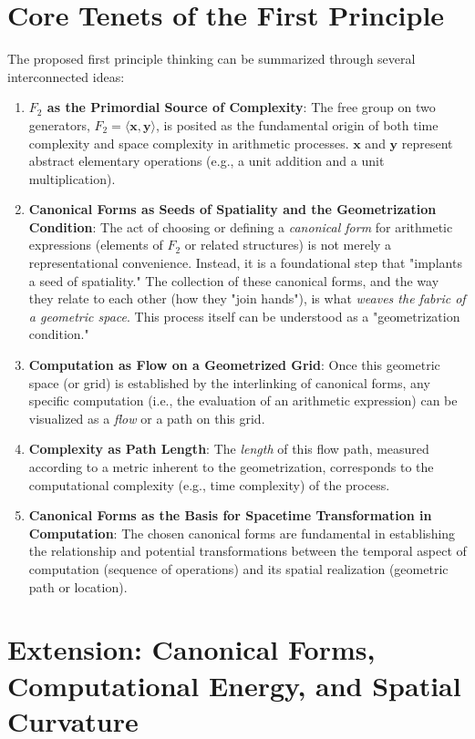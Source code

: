 \documentclass[12pt, a4paper]{article}
\theoremstyle{definition}
\begin{document}
\section{Core Tenets of the First Principle}

The proposed first principle thinking can be summarized through several interconnected ideas:

\begin{enumerate}
    \item \textbf{$F_2$ as the Primordial Source of Complexity}: The free group on two generators, $F_2 = \langle \mathbf{x}, \mathbf{y} \rangle$, is posited as the fundamental origin of both time complexity and space complexity in arithmetic processes. $\mathbf{x}$ and $\mathbf{y}$ represent abstract elementary operations (e.g., a unit addition and a unit multiplication).
    \item \textbf{Canonical Forms as Seeds of Spatiality and the Geometrization Condition}: The act of choosing or defining a \textit{canonical form} for arithmetic expressions (elements of $F_2$ or related structures) is not merely a representational convenience. Instead, it is a foundational step that "implants a seed of spatiality." The collection of these canonical forms, and the way they relate to each other (how they "join hands"), is what \textit{weaves the fabric of a geometric space}. This process itself can be understood as a "geometrization condition."
    \item \textbf{Computation as Flow on a Geometrized Grid}: Once this geometric space (or grid) is established by the interlinking of canonical forms, any specific computation (i.e., the evaluation of an arithmetic expression) can be visualized as a \textit{flow} or a path on this grid.
    \item \textbf{Complexity as Path Length}: The \textit{length} of this flow path, measured according to a metric inherent to the geometrization, corresponds to the computational complexity (e.g., time complexity) of the process.
    \item \textbf{Canonical Forms as the Basis for Spacetime Transformation in Computation}: The chosen canonical forms are fundamental in establishing the relationship and potential transformations between the temporal aspect of computation (sequence of operations) and its spatial realization (geometric path or location).
\end{enumerate}

\section{Extension: Canonical Forms, Computational Energy, and Spatial Curvature}
\end{document}
